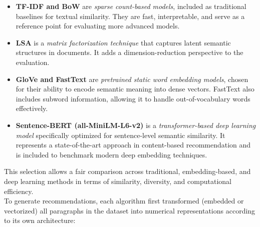 \documentclass{llncs}
\begin{document}
\begin{itemize}
    \item \textbf{TF-IDF and BoW} are \emph{sparse count-based models}, included as traditional baselines for textual similarity. They are fast, interpretable, and serve as a reference point for evaluating more advanced models.
    \item \textbf{LSA} is a \emph{matrix factorization technique} that captures latent semantic structures in documents. It adds a dimension-reduction perspective to the evaluation.
    \item \textbf{GloVe and FastText} are \emph{pretrained static word embedding models}, chosen for their ability to encode semantic meaning into dense vectors. FastText also includes subword information, allowing it to handle out-of-vocabulary words effectively.
    \item \textbf{Sentence-BERT (all-MiniLM-L6-v2)} is a \emph{transformer-based deep learning model} specifically optimized for sentence-level semantic similarity. It represents a state-of-the-art approach in content-based recommendation and is included to benchmark modern deep embedding techniques.
\end{itemize}
%
This selection allows a fair comparison across traditional, embedding-based, and deep learning methods in terms of similarity, diversity, and computational efficiency.\\
%
%
To generate recommendations, each algorithm first transformed (embedded or vectorized) all paragraphs in the dataset into numerical representations according to its own architecture:
%
\end{document}
